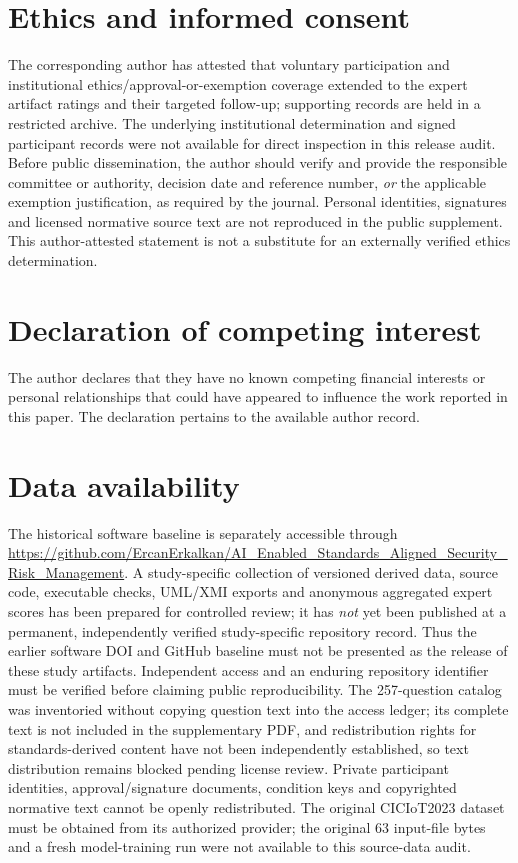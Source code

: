 \documentclass[12pt,a4paper]{article}
\newcommand{\RepoURL}{https://github.com/ErcanErkalkan/AI_Enabled_Standards_Aligned_Security_Risk_Management}
\newcommand{\repo}{\url{\RepoURL}}
\begin{document}
\section*{Ethics and informed consent}
The corresponding author has attested that voluntary participation and institutional ethics/approval-or-exemption coverage extended to the expert artifact ratings and their targeted follow-up; supporting records are held in a restricted archive. The underlying institutional determination and signed participant records were not available for direct inspection in this release audit. Before public dissemination, the author should verify and provide the responsible committee or authority, decision date and reference number, \emph{or} the applicable exemption justification, as required by the journal. Personal identities, signatures and licensed normative source text are not reproduced in the public supplement. This author-attested statement is not a substitute for an externally verified ethics determination.
\section*{Declaration of competing interest}
The author declares that they have no known competing financial interests or personal relationships that could have appeared to influence the work reported in this paper. The declaration pertains to the available author record.
\section*{Data availability}
The historical software baseline is separately accessible through \repo. A study-specific collection of versioned derived data, source code, executable checks, UML/XMI exports and anonymous aggregated expert scores has been prepared for controlled review; it has \emph{not} yet been published at a permanent, independently verified study-specific repository record. Thus the earlier software DOI and GitHub baseline must not be presented as the release of these study artifacts. Independent access and an enduring repository identifier must be verified before claiming public reproducibility. The 257-question catalog was inventoried without copying question text into the access ledger; its complete text is not included in the supplementary PDF, and redistribution rights for standards-derived content have not been independently established, so text distribution remains blocked pending license review. Private participant identities, approval/signature documents, condition keys and copyrighted normative text cannot be openly redistributed. The original CICIoT2023 dataset must be obtained from its authorized provider; the original 63 input-file bytes and a fresh model-training run were not available to this source-data audit.
\end{document}
